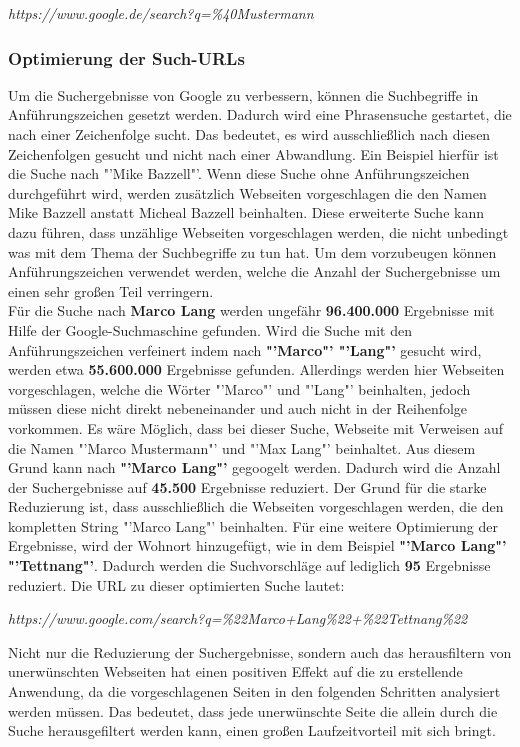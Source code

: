 			\textit{https://www.google.de/search?q=\%40Mustermann}
			
			\subsubsection{Optimierung der Such-URLs}
			\label{subsubsec:URLOptimieren}
			Um die Suchergebnisse von Google zu verbessern, können die Suchbegriffe in Anführungszeichen gesetzt werden. Dadurch wird eine Phrasensuche gestartet, die nach einer Zeichenfolge sucht. Das bedeutet, es wird ausschließlich nach diesen Zeichenfolgen gesucht und nicht nach einer Abwandlung. Ein Beispiel hierfür ist die Suche nach "'Mike Bazzell"'. Wenn diese Suche ohne Anführungszeichen durchgeführt wird, werden zusätzlich Webseiten vorgeschlagen die den Namen Mike Bazzell anstatt Micheal Bazzell beinhalten. Diese erweiterte Suche kann dazu führen, dass unzählige Webseiten vorgeschlagen werden, die nicht unbedingt was mit dem Thema der Suchbegriffe zu tun hat. Um dem vorzubeugen können Anführungszeichen verwendet werden, welche die Anzahl der Suchergebnisse um einen sehr großen Teil verringern. \cite{Bazzell}\\
			Für die Suche nach \textbf{Marco Lang} werden ungefähr \textbf{96.400.000} Ergebnisse mit Hilfe der Google-Suchmaschine gefunden. Wird die Suche mit den Anführungszeichen verfeinert indem nach \textbf{"'Marco"' "'Lang"'} gesucht wird, werden etwa \textbf{55.600.000} Ergebnisse gefunden. Allerdings werden hier Webseiten vorgeschlagen, welche die Wörter "'Marco"' und "'Lang"' beinhalten, jedoch müssen diese nicht direkt nebeneinander und auch nicht in der Reihenfolge vorkommen. Es wäre Möglich, dass bei dieser Suche, Webseite mit Verweisen auf die Namen "'Marco Mustermann"' und "'Max Lang"' beinhaltet. Aus diesem Grund kann nach \textbf{"'Marco Lang"'} gegoogelt werden. Dadurch wird die Anzahl der Suchergebnisse auf \textbf{45.500} Ergebnisse reduziert. Der Grund für die starke Reduzierung ist, dass ausschließlich die Webseiten vorgeschlagen werden, die den kompletten String "'Marco Lang"' beinhalten. Für eine weitere Optimierung der Ergebnisse, wird der Wohnort hinzugefügt, wie in dem Beispiel \textbf{"'Marco Lang"' "'Tettnang"'}. Dadurch werden die Suchvorschläge auf lediglich \textbf{95} Ergebnisse reduziert. Die URL zu dieser optimierten Suche lautet: 
			
			\textit{https://www.google.com/search?q=\%22Marco+Lang\%22+\%22Tettnang\%22}
			
			Nicht nur die Reduzierung der Suchergebnisse, sondern auch das herausfiltern von unerwünschten Webseiten hat einen positiven Effekt auf die zu erstellende Anwendung, da die vorgeschlagenen Seiten in den folgenden Schritten analysiert werden müssen. Das bedeutet, dass jede unerwünschte Seite die allein durch die Suche herausgefiltert werden kann, einen großen Laufzeitvorteil mit sich bringt. 
			
